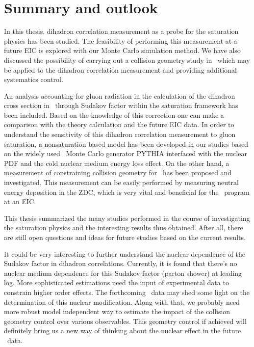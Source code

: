 \chapter{Summary and outlook} \label{chp:summary}

In this thesis, dihadron correlation measurement as a probe for the saturation
physics has been studied. The feasibility of performing this measurement at a
future EIC is explored with our Monte Carlo simulation method. We have also
discussed the possibility of carrying out a collision geometry study in \eA\,
which may be applied to the dihadron correlation measurement and providing
additional systematics control.

An analysis accounting for gluon radiation in the calculation of the dihadron
cross section in \eA\ through Sudakov factor within the saturation framework has
been included. Based on the knowledge of this correction one can make a
comparison with the theory calculation and the future EIC data. In order to
understand the sensitivity of this dihadron correlation measurement to gluon
saturation, a nonsaturation based model has been developed in our studies based
on the widely used \ep\ Monte Carlo generator PYTHIA interfaced with the nuclear
PDF and the cold nuclear medium energy loss effect. On the other hand, a
measurement of constraining collision geometry for \eA\ has been proposed and
investigated. This measurement can be easily performed by measuring neutral
energy deposition in the ZDC, which is very vital and beneficial for the \eA\ program at an EIC. 

This thesis summarized the many studies performed in the course of investigating
the saturation physics and the interesting results thus obtained. After all, there
are still open questions and ideas for future studies based on the current
results.

It could be very interesting to further understand the nuclear dependence of the
Sudakov factor in dihadron correlations. Currently, it is found that there's no
nuclear medium dependence for this Sudakov factor (parton shower) at leading
log. More sophisticated estimations need the input of experimental data to
constrain higher order effects. The forthcoming \pA\ data may shed some light on
the determination of this nuclear modification. Along with that, we probably
need more robust model independent way to estimate the impact of the collision
geometry control over various observables. This geometry control if achieved
will definitely bring us a new way of thinking about the nuclear effect in the
future \eA\ data.

